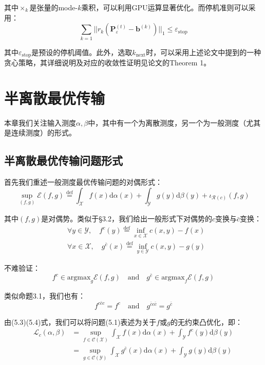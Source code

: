 \documentclass[cn,10pt,math=newtx,citestyle=gb7714-2015,bibstyle=gb7714-2015]{elegantbook}
\begin{document}
其中$\times_k$是张量的mode-$k$乘积，可以利用GPU运算显著优化。而停机准则可以采用：
\begin{equation}
    \sum_{k=1}|| r_k(\mathbf{P}_\varepsilon^{(t)}-\mathbf{b}^{(k)})||_1 \leq \varepsilon_\text{stop}
\end{equation}

其中$\varepsilon_\text{stop}$是预设的停机阈值。此外，选取$k_{\text{next}}$时，可以采用上述论文中提到的一种贪心策略，其详细说明及对应的收敛性证明见论文的Theorem 1。

\chapter{半离散最优传输}

本章我们关注输入测度$\alpha,\beta$中，其中有一个为离散测度，另一个为一般测度（尤其是连续测度）的形式。

\section{半离散最优传输问题形式}

首先我们重述一般测度最优传输问题的对偶形式：
\begin{equation}
    \label{5.1}
    \sup_{(f,g)} \mathcal{E}(f,g) \overset{\text{def}}{=} \int_\mathcal{X} f(x)\text{d}\alpha(x) + \int_\mathcal{Y}g(y)\text{d}\beta(y) + \iota_{\mathcal{R}(c)}(f,g)
\end{equation}

其中$(f,g)$是对偶势。类似于\S 3.2，我们给出一般形式下对偶势的$c$变换与$\bar c$变换：
\begin{align}
    & \forall y\in \mathcal{Y}, \quad f^c(y) \overset{\text{def}}{=} \inf_{x\in \mathcal{X}} c(x,y)-f(x)\\
    & \forall x\in \mathcal{X}, \quad g^{\bar c}(x) \overset{\text{def}}{=} \inf_{y\in \mathcal{Y}} c(x,y)-g(y)
\end{align}

不难验证：
\begin{equation}
    f^c \in \text{argmax}_g \mathcal{E}(f,g) \quad \text{and} \quad g^{\bar c} \in \text{argmax}_f \mathcal{E}(f,g)
\end{equation}

类似命题3.1，我们也有：
\begin{equation}
    f^{c\bar c c} = f^c \quad \text{and} \quad g^{\bar c c \bar c}=g^{\bar c}
\end{equation}

由(5.3)(5.4)式，我们可以将问题(5.1)表述为关于$f$或$g$的无约束凸优化，即：
\begin{align}
    \mathcal{L}_c(\alpha, \beta) &= \sup_{f\in \mathcal{C(X)}} \int_\mathcal{X} f(x) \text{d}\alpha(x) + \int_\mathcal{Y} f^c(y) \text{d}\beta(y)\\
    &= \sup_{g\in \mathcal{C(Y)}} \int_\mathcal{X} g^{\bar c}(x) \text{d}\alpha(x) + \int_\mathcal{Y} g(y) \text{d}\beta(y)
\end{align}
\end{document}
